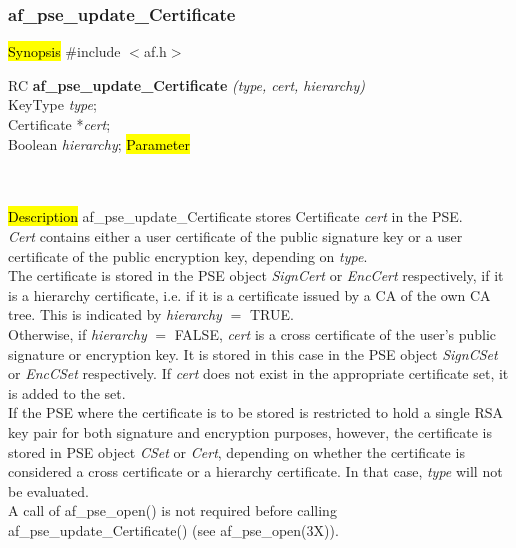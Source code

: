 \subsubsection{af\_pse\_update\_Certificate}
\label{af_update_Certificate}
\hl{Synopsis}
\#include $<$af.h$>$

RC {\bf af\_pse\_update\_Certificate} {\em (type, cert, hierarchy)} \\
KeyType {\em type}; \\
Certificate *{\em cert}; \\
Boolean {\em hierarchy};
\hl{Parameter}

 \\
 \\
\hl{Description}
af\_pse\_update\_Certificate stores Certificate {\em cert} in the PSE.
\\ [1em]
{\em Cert} contains either a user certificate of the public signature key 
or a user certificate of the public encryption key, depending on {\em type}.
\\ [1em]
The certificate is stored in the PSE object {\em SignCert} or 
{\em EncCert} respectively, if it is a hierarchy certificate, i.e. if it is a certificate
issued by a CA of the own CA tree. This is indicated by {\em hierarchy} $=$ TRUE. 
\\ [1em]
Otherwise, if {\em hierarchy} $=$ FALSE, {\em cert} is a cross certificate of the user's
public signature or encryption key. It is stored in this case in the PSE object {\em SignCSet} or 
{\em EncCSet} respectively.
If {\em cert} does not exist in the appropriate certificate set,
it is added to the set.
\\ [1em]
If the PSE where the certificate is to be stored is restricted to hold a single RSA key pair
for both signature and encryption purposes, however, the certificate is stored in PSE object {\em CSet} or {\em Cert},
depending on whether the certificate is considered a cross certificate or a hierarchy certificate. In that case, {\em type} will not
be evaluated.
\\ [1em]
A call of af\_pse\_open() is not required before calling af\_pse\_update\_Certificate()
(see af\_pse\_open(3X)).

